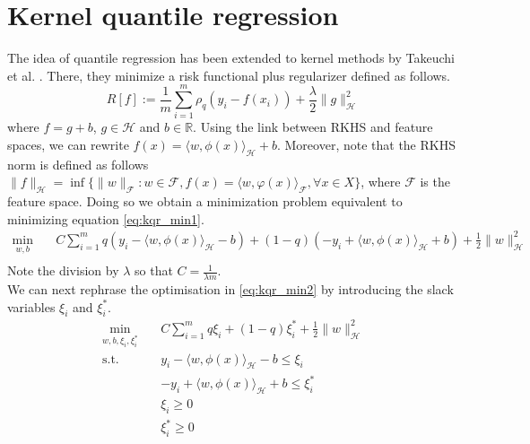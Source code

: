 \section{Kernel quantile regression}
The idea of quantile regression has been extended to kernel methods by Takeuchi et al. \cite{takeuchi2006nonparametric}.
There, they minimize a risk functional plus regularizer defined as follows.
\begin{equation}\label{eq:kqr_min1}
    R[f]:=\frac{1}{m}\sum\limits_{i=1}^{m}\rho_q(y_i-f(x_i))+\frac{\lambda}{2}\|g\|_\mathcal{H}^2
\end{equation}
where $f=g+b$, $g \in \mathcal{H}$ and $b \in \mathbb{R}$.
Using the link between RKHS and feature spaces, we can rewrite $f(x)=\langle w, \phi(x) \rangle_{\mathcal{H}}+b$. Moreover, note that the RKHS norm is defined as follows $\|f\|_{\mathcal{H}}=\inf\{\|w\|_{\mathcal{F}}:w\in \mathcal{F},f(x)=\langle w,\varphi (x)\rangle _{\mathcal{F}},\forall x\in X\}$, where $\mathcal{F}$ is the feature space.
 Doing so we obtain a minimization problem equivalent to minimizing equation \ref{eq:kqr_min1}.
\begin{equation}\label{eq:kqr_min2}
    \begin{aligned}
    \min_{w,b} \quad & C \sum \limits_{i=1}^{m}
    q(y_i-\langle w, \phi(x) \rangle_{\mathcal{H}}-b)+ (1-q)(-y_i+\langle w, \phi(x) \rangle_{\mathcal{H}}+b)+ \frac{1}{2}\|w\|_{\mathcal{H}}^2\\
    \end{aligned}
    \end{equation}
Note the division by $\lambda$ so that $C=\frac{1}{\lambda m}$.
\\
We can next rephrase the optimisation in \ref{eq:kqr_min2} by introducing the slack variables $\xi_i$ and $\xi_i^*$.
\begin{equation}\label{eq:kqr_min3}
    \begin{aligned}
        \min_{w,b,\xi_i,\xi_i^*} \quad & C \sum \limits_{i=1}^{m}
        q \xi_i+ (1-q)\xi_i^*+ \frac{1}{2}\|w\|_{\mathcal{H}}^2\\
    \textrm{s.t.} \quad & y_i-\langle w, \phi(x) \rangle_{\mathcal{H}}-b \leq \xi_i\\
    & -y_i+\langle w, \phi(x) \rangle_{\mathcal{H}}+b \leq \xi_i^*\\
      &\xi_i\geq0    \\
      &\xi_i^*\geq0    \\
    \end{aligned}
    \end{equation}
